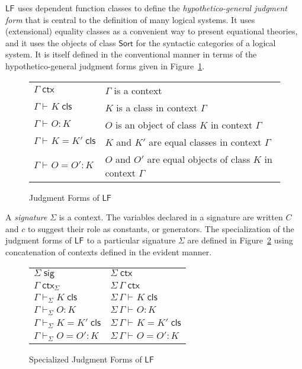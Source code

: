 \documentclass[11pt,twoside]{article}
\newcommand{\LF}[1][]{\ensuremath{\mathsf{LF}_{#1}}}
\newcommand{\sortclass}{\ensuremath{\textsf{Sort}}}
\newcommand{\appctx}[2]{{#1}\,{#2}}
\newcommand{\issig}[1]{{#1}\;\mathsf{sig}}
\newcommand{\isctx}[2][]{{#2}\;\mathsf{ctx}_{#1}}
\newcommand{\iscls}[3][]{{#2}\vdash_{#1}{#3}\;\mathsf{cls}}
\newcommand{\eqcls}[4][]{{#2}\vdash_{#1}{#3}={#4}\;\mathsf{cls}}
\newcommand{\isobj}[4][]{{#2}\vdash_{#1}{#3}:{#4}}
\newcommand{\eqobj}[5][]{{#2}\vdash_{#1}{#3}={#4}:{#5}}
\begin{document}
\LF{} uses dependent function classes to define the \emph{hypothetico-general judgment
  form} that is central to the definition of many logical systems.  It uses (extensional)
equality classes as a convenient way to present equational theories, and it uses the
objects of class \sortclass{} for the syntactic categories of a logical system.  It is
itself defined in the conventional manner in terms of the hypothetico-general judgment
forms given in Figure~\ref{fig:lf-judgments}.

\begin{figure}[tp]
  \centering
  \begin{tabular}{l@{\qquad}l}
    $\isctx{\Gamma}$ & $\Gamma$ is a context \\[1ex]
    $\iscls{\Gamma}{K}$ & $K$ is a class in context $\Gamma$ \\
    $\isobj{\Gamma}{O}{K}$ & $O$ is an object of class $K$ in context $\Gamma$ \\[1ex]
    $\eqcls{\Gamma}{K}{K'}$ & $K$ and $K'$ are equal classes in context $\Gamma$ \\
    $\eqobj{\Gamma}{O}{O'}{K}$ & $O$ and $O'$ are equal objects of class $K$ in context $\Gamma$
  \end{tabular}
  \caption{Judgment Forms of \LF{}}
  \label{fig:lf-judgments}
\end{figure}

A \emph{signature} $\Sigma$ is a context.  The variables declared in a signature are written
$C$ and $c$ to suggest their role as constants, or generators.  The specialization of the
judgment forms of \LF{} to a particular signature $\Sigma$ are defined in
Figure~\ref{fig:lf-specialized} using concatenation of contexts defined in the evident
manner.

\begin{figure}[tp]
  \centering
  \begin{tabular}{l@{\qquad\qquad}l}
    $\issig{\Sigma}$             & $\isctx{\Sigma}$ \\[1ex]

    $\isctx[\Sigma]{\Gamma}$           & $\isctx{\appctx{\Sigma}{\Gamma}}$  \\[1ex]
    
    $\iscls[\Sigma]{\Gamma}{K}$           & $\iscls{\appctx{\Sigma}{\Gamma}}{K}$ \\
    $\isobj[\Sigma]{\Gamma}{O}{K}$     & $\isobj{\appctx{\Sigma}{\Gamma}}{O}{K}$ \\[1ex]

    $\eqcls[\Sigma]{\Gamma}{K}{K'}$   & $\eqcls{\appctx{\Sigma}{\Gamma}}{K}{K'}$ \\
    $\eqobj[\Sigma]{\Gamma}{O}{O'}{K}$ & $\eqobj{\appctx{\Sigma}{\Gamma}}{O}{O'}{K}$
  \end{tabular}
  \caption{Specialized Judgment Forms of \LF{}}
  \label{fig:lf-specialized}
\end{figure}
\end{document}
